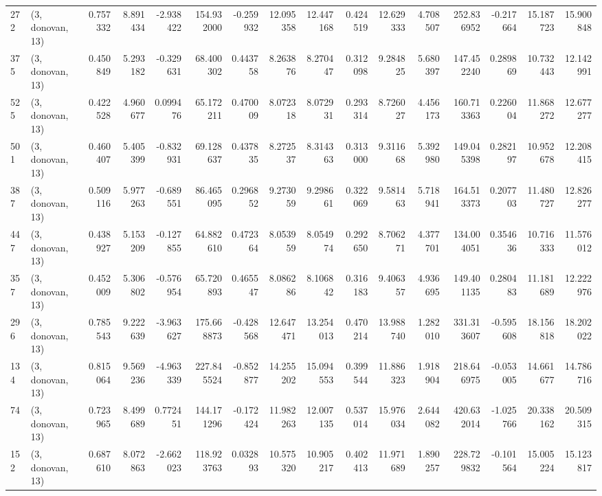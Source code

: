 \begin{tabular}{llrrrrrrrrrrrrrr}
272 &  (3, donovan, 13) &   0.757332 &   8.891434 &  -2.938422 &   154.932000 &  -0.259932 &  12.095358 &  12.447168 &  0.424519 &  12.629333 &   4.708507 &   252.836952 & -0.217664 &  15.187723 &  15.900848 \\
375 &  (3, donovan, 13) &   0.450849 &   5.293182 &  -0.329631 &    68.400302 &   0.443758 &   8.263876 &   8.270447 &  0.312098 &   9.284825 &   5.680397 &   147.452240 &  0.289869 &  10.732443 &  12.142991 \\
525 &  (3, donovan, 13) &   0.422528 &   4.960677 &   0.099476 &    65.172211 &   0.470009 &   8.072318 &   8.072931 &  0.293314 &   8.726027 &   4.456173 &   160.713363 &  0.226004 &  11.868272 &  12.677277 \\
501 &  (3, donovan, 13) &   0.460407 &   5.405399 &  -0.832931 &    69.128637 &   0.437835 &   8.272537 &   8.314363 &  0.313000 &   9.311668 &   5.392980 &   149.045398 &  0.282197 &  10.952678 &  12.208415 \\
387 &  (3, donovan, 13) &   0.509116 &   5.977263 &  -0.689551 &    86.465095 &   0.296852 &   9.273059 &   9.298661 &  0.322069 &   9.581463 &   5.718941 &   164.513373 &  0.207703 &  11.480727 &  12.826277 \\
447 &  (3, donovan, 13) &   0.438927 &   5.153209 &  -0.127855 &    64.882610 &   0.472364 &   8.053959 &   8.054974 &  0.292650 &   8.706271 &   4.377701 &   134.004051 &  0.354636 &  10.716333 &  11.576012 \\
357 &  (3, donovan, 13) &   0.452009 &   5.306802 &  -0.576954 &    65.720893 &   0.465547 &   8.086286 &   8.106842 &  0.316183 &   9.406357 &   4.936695 &   149.401135 &  0.280483 &  11.181689 &  12.222976 \\
296 &  (3, donovan, 13) &   0.785543 &   9.222639 &  -3.963627 &   175.668873 &  -0.428568 &  12.647471 &  13.254013 &  0.470214 &  13.988740 &   1.282010 &   331.313607 & -0.595608 &  18.156818 &  18.202022 \\
134 &  (3, donovan, 13) &   0.815064 &   9.569236 &  -4.963339 &   227.845524 &  -0.852877 &  14.255202 &  15.094553 &  0.399544 &  11.886323 &   1.918904 &   218.646975 & -0.053005 &  14.661677 &  14.786716 \\
74  &  (3, donovan, 13) &   0.723965 &   8.499689 &   0.772451 &   144.171296 &  -0.172424 &  11.982263 &  12.007135 &  0.537014 &  15.976034 &   2.644082 &   420.632014 & -1.025766 &  20.338162 &  20.509315 \\
152 &  (3, donovan, 13) &   0.687610 &   8.072863 &  -2.662023 &   118.923763 &   0.032893 &  10.575320 &  10.905217 &  0.402413 &  11.971689 &   1.890257 &   228.729832 & -0.101564 &  15.005224 &  15.123817 \\

\end{tabular}

